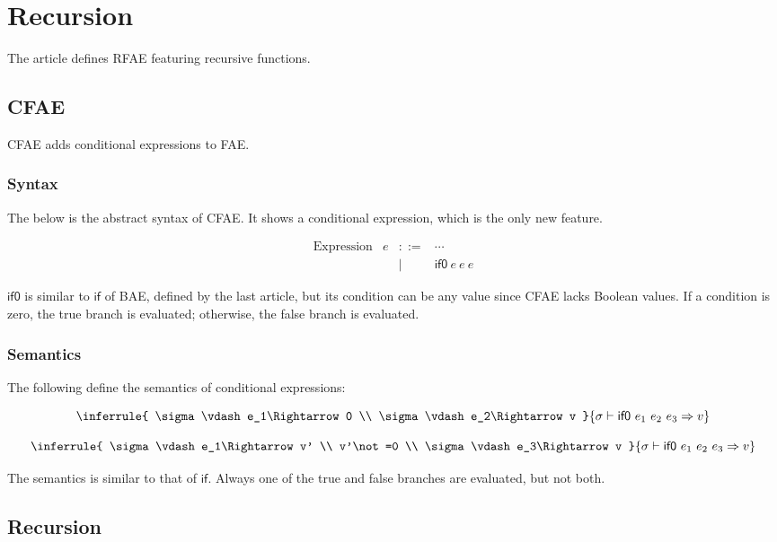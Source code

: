 \setchapterpreamble[u]{\margintoc}
\chapter{Recursion}

The article defines RFAE featuring recursive functions.

\section{CFAE}

CFAE adds conditional expressions to FAE.

\subsection{Syntax}

The below is the abstract syntax of CFAE. It shows a conditional expression,
which is the only new feature.

\[
\begin{array}{lrcl}
\text{Expression} & e & ::= & \cdots \\
&& | & \textsf{if0}\ e\ e\ e
\end{array}
\]

\(\textsf{if0}\) is similar to \(\textsf{if}\) of BAE, defined by the last
article, but its condition can be any value since CFAE lacks Boolean values. If a
condition is zero, the true branch is evaluated; otherwise, the false branch is
evaluated.

\subsection{Semantics}

The following define the semantics of conditional expressions:

\[
\inferrule
{ \sigma\vdash e_1\Rightarrow 0 \\ \sigma\vdash e_2\Rightarrow v }
{ \sigma\vdash \textsf{if0}\ e_1\ e_2\ e_3\Rightarrow v}
\]

\[
\inferrule
{ \sigma\vdash e_1\Rightarrow v' \\ v'\not=0 \\ \sigma\vdash e_3\Rightarrow v }
{ \sigma\vdash \textsf{if0}\ e_1\ e_2\ e_3\Rightarrow v}
\]

The semantics is similar to that of \(\textsf{if}\). Always one of the true and
false branches are evaluated, but not both.

\section{Recursion}

